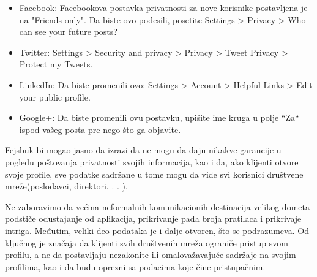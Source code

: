\documentclass[a4paper]{article}
\begin{document}
\begin{itemize}
\item Facebook: Facebookova postavka privatnosti za nove korisnike postavljena je na "Friends only". Da biste ovo podesili, posetite Settings > Privacy > Who can see your future posts?
\item Twitter: Settings > Security and privacy > Privacy > Tweet Privacy > Protect my Tweets. 
\item LinkedIn: Da biste promenili ovo: Settings >  Account > Helpful Links > Edit your public profile. 
\item Google+: Da biste promenili ovu postavku, upišite ime kruga u polje “Za“ ispod vašeg posta pre nego što ga objavite. 
\end{itemize}

Fejsbuk bi mogao jasno   da izrazi da ne mogu   da daju nikakve  garancije u  pogledu poštovanja privatnosti svojih  informacija, kao i da, ako klijenti otvore svoje profile, sve podatke sadržane u tome mogu da vide svi korisnici društvene mreže(poslodavci, direktori. . . ). 
\par Ne zaboravimo da  većina neformalnih komunikacionih destinacija velikog dometa
podstiče odustajanje od aplikacija, prikrivanje pada broja pratilaca i prikrivaje intriga. Međutim, veliki deo podataka je i dalje otvoren, što se podrazumeva. Od ključnog je značaja da klijenti svih društvenih mreža ograniče pristup svom profilu, a ne da postavljaju nezakonite ili omalovažavajuće sadržaje na svojim profilima, kao i da budu oprezni sa podacima koje čine pristupačnim. 

\newpage
 
\end{document}
